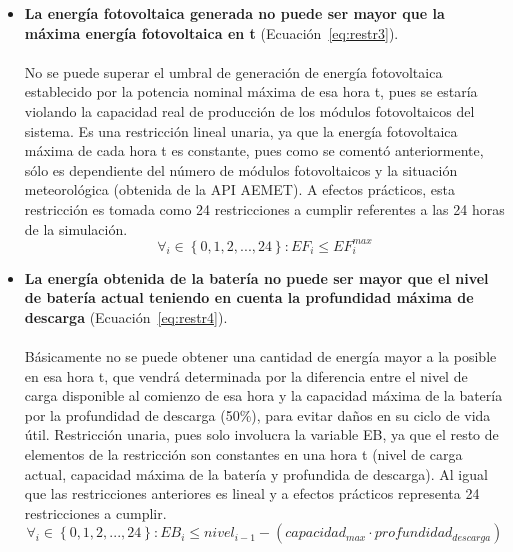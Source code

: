 \begin{itemize}
\item \textbf{La energía fotovoltaica generada no puede ser mayor que la máxima energía fotovoltaica en t} (Ecuación~\ref{eq:restr3}).\\ \\No se puede superar el umbral de generación de energía fotovoltaica establecido por la potencia nominal máxima de esa hora t, pues se estaría violando la capacidad real de producción de los módulos fotovoltaicos del sistema. Es una restricción lineal unaria, ya que la energía fotovoltaica máxima de cada hora t es constante, pues como se comentó anteriormente, sólo es dependiente del número de módulos fotovoltaicos y la situación meteorológica (obtenida de la API AEMET). A efectos prácticos, esta restricción es tomada como 24 restricciones a cumplir referentes a las 24 horas de la simulación.
\begin{equation}
        \label{eq:restr3}
        \forall_{i} \in \left\{ 0, 1, 2, ..., 24 \right\} : EF_{i} \leq EF_{i}^{max}
\end{equation}

\item \textbf{La energía obtenida de la batería no puede ser mayor que el nivel de batería actual teniendo en cuenta la profundidad máxima de descarga} (Ecuación~\ref{eq:restr4}).\\ \\Básicamente no se puede obtener una cantidad de energía mayor a la posible en esa hora t, que vendrá determinada por la diferencia entre el  nivel de carga disponible al comienzo de esa hora y la capacidad máxima de la batería por la profundidad de descarga (50\%), para evitar daños en su ciclo de vida útil. Restricción unaria, pues solo involucra la variable EB, ya que el resto de elementos de la restricción son constantes en una hora t (nivel de carga actual, capacidad máxima de la batería y profundida de descarga). Al igual que las restricciones anteriores es lineal y a efectos prácticos representa 24 restricciones a cumplir.
\begin{equation}
        \label{eq:restr4}
        \forall_{i} \in \left\{ 0, 1, 2, ..., 24 \right\} : EB_{i} \leq nivel_{i-1} - (capacidad_{max} \cdot profundidad_{descarga})
\end{equation}


\end{itemize}
